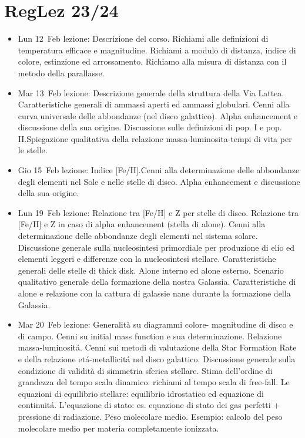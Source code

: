 \section{RegLez 23/24}
\begin{itemize}
\item Lun 12 Feb lezione: Descrizione del corso. Richiami alle definizioni di temperatura efficace e magnitudine. Richiami a modulo di distanza, indice di colore, estinzione ed arrossamento. Richiamo alla misura di distanza con il metodo della parallasse. 
\item Mar 13 Feb lezione: Descrizione generale della struttura della Via Lattea. Caratteristiche generali di ammassi aperti ed ammassi globulari. Cenni alla curva universale delle abbondanze (nel disco galattico). Alpha enhancement e discussione della sua origine. Discussione sulle definizioni di pop. I e pop. II.Spiegazione qualitativa della relazione massa-luminosita-tempi di vita per le stelle. 
\item Gio 15 Feb lezione: Indice [Fe/H].Cenni alla determinazione delle abbondanze degli elementi nel Sole e nelle stelle di disco. Alpha enhancement e discussione della sua origine. 
\item Lun 19 Feb lezione: Relazione tra [Fe/H] e Z per stelle di disco. Relazione tra [Fe/H] e Z in caso di alpha enhancement (stella di alone). Cenni alla determinazione delle abbondanze degli elementi nel sistema solare. Discussione generale sulla nucleosintesi primordiale per produzione di elio ed elementi leggeri e differenze con la nucleosintesi stellare. Caratteristiche generali delle stelle di thick disk. Alone interno ed alone esterno. Scenario qualitativo generale della formazione della nostra Galassia. Caratteristiche di alone e relazione con la cattura di galassie nane durante la formazione della Galassia. 
\item Mar 20 Feb lezione: Generalità su diagrammi colore- magnitudine di disco e di campo. Cenni su initial mass function e sua determinazione. Relazione massa-luminosit\'a. Cenni sui metodi di valutazione della Star Formation Rate e della relazione et\'a-metallicit\'a nel disco galattico. Discussione generale sulla condizione di validità di simmetria sferica stellare. Stima dell'ordine di grandezza del tempo scala dinamico: richiami al tempo scala di free-fall. Le equazioni di equilibrio stellare: equilibrio idrostatico ed equazione di continuit\'a. L'equazione di stato: es. equazione di stato dei gas perfetti + pressione di radiazione. Peso molecolare medio. Esempio: calcolo del peso molecolare medio per materia completamente ionizzata. 

\end{itemize}
